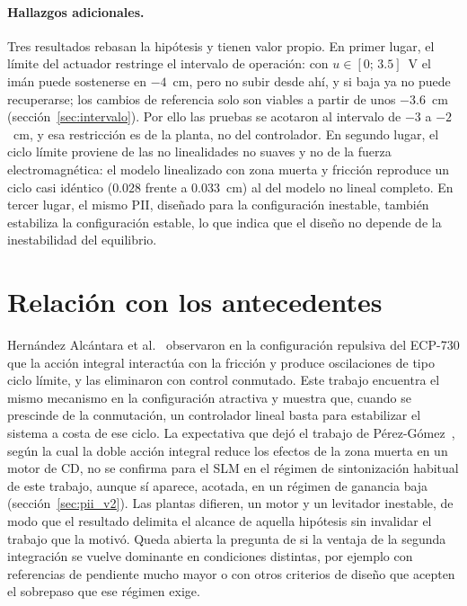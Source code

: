 \paragraph{Hallazgos adicionales.}
Tres resultados rebasan la hipótesis y tienen valor propio. En primer lugar, el límite del actuador restringe el intervalo de operación: con $u\in[0;\,3.5]$~V el imán puede sostenerse en $-4$~cm, pero no subir desde ahí, y si baja ya no puede recuperarse; los cambios de referencia solo son viables a partir de unos $-3.6$~cm (sección~\ref{sec:intervalo}). Por ello las pruebas se acotaron al intervalo de $-3$ a $-2$~cm, y esa restricción es de la planta, no del controlador. En segundo lugar, el ciclo límite proviene de las no linealidades no suaves y no de la fuerza electromagnética: el modelo linealizado con zona muerta y fricción reproduce un ciclo casi idéntico ($0.028$ frente a $0.033$~cm) al del modelo no lineal completo. En tercer lugar, el mismo PII, diseñado para la configuración inestable, también estabiliza la configuración estable, lo que indica que el diseño no depende de la inestabilidad del equilibrio.

\section{Relación con los antecedentes}

Hernández Alcántara et al.~\cite{alcantara} observaron en la configuración repulsiva del ECP-730 que la acción integral interactúa con la fricción y produce oscilaciones de tipo ciclo límite, y las eliminaron con control conmutado. Este trabajo encuentra el mismo mecanismo en la configuración atractiva y muestra que, cuando se prescinde de la conmutación, un controlador lineal basta para estabilizar el sistema a costa de ese ciclo. La expectativa que dejó el trabajo de Pérez-Gómez~\cite{perez}, según la cual la doble acción integral reduce los efectos de la zona muerta en un motor de CD, no se confirma para el SLM en el régimen de sintonización habitual de este trabajo, aunque sí aparece, acotada, en un régimen de ganancia baja (sección~\ref{sec:pii_v2}). Las plantas difieren, un motor y un levitador inestable, de modo que el resultado delimita el alcance de aquella hipótesis sin invalidar el trabajo que la motivó. Queda abierta la pregunta de si la ventaja de la segunda integración se vuelve dominante en condiciones distintas, por ejemplo con referencias de pendiente mucho mayor o con otros criterios de diseño que acepten el sobrepaso que ese régimen exige.


